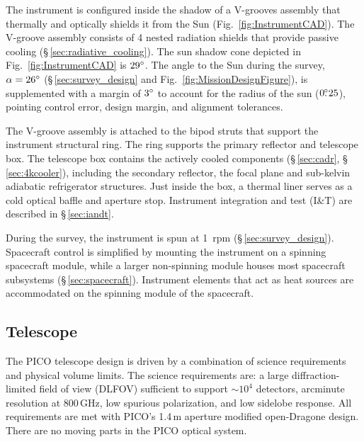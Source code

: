 The instrument is configured inside the shadow of a V-grooves assembly that thermally and optically shields it from the Sun (Fig.~\ref{fig:InstrumentCAD}). The V-groove assembly consists of 4 nested radiation shields that provide passive cooling (\S\,\ref{sec:radiative_cooling}). The sun shadow cone depicted in Fig.~\ref{fig:InstrumentCAD} is $29^\circ$. The angle to the Sun during the survey, $\alpha = 26^\circ$ (\S\,\ref{sec:survey_design} and Fig.~\ref{fig:MissionDesignFigure}), is supplemented with a margin of $3^\circ$ to account for the radius of the sun ($0.\!\!^\circ25$), pointing control error, design margin, and alignment tolerances.


The V-groove assembly is attached to the bipod struts that support the instrument structural ring. The ring supports the primary reflector and telescope box. The telescope box contains the actively cooled components (\S\,\ref{sec:cadr}, \S\,\ref{sec:4kcooler}), including the secondary reflector, the focal plane and sub-kelvin adiabatic refrigerator structures. Just inside the box, a thermal liner serves as a cold optical baffle and aperture stop. Instrument integration and test (I\&T) are described in \S\,\ref{sec:iandt}.

During the survey, the instrument is spun at 1~rpm (\S\,\ref{sec:survey_design}). Spacecraft control is simplified by mounting the instrument on a spinning spacecraft module, while a larger non-spinning module houses most spacecraft subsystems (\S\,\ref{sec:spacecraft}). Instrument elements that act as heat sources are accommodated on the spinning module of the spacecraft.

\subsection{Telescope}
\label{sec:telescope} %

The PICO telescope design is driven by a combination of science
requirements and physical volume limits. The science requirements are:
a large diffraction-limited field of view (DLFOV) sufficient to
support $\sim10^4$ detectors, arcminute resolution at 800\,GHz, low
spurious polarization, and low sidelobe response. All
requirements are met with PICO's 1.4\,m aperture modified open-Dragone
design. There are no moving parts in the PICO optical system.

